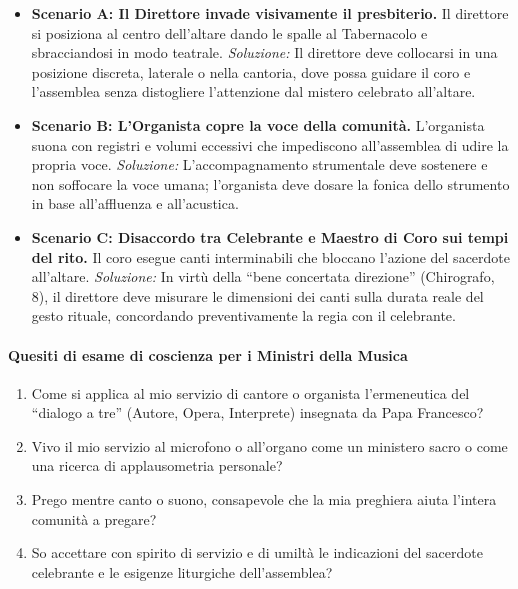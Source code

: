 \documentclass[12pt,a4paper]{article}
\begin{document}
	\begin{itemize}[leftmargin=*]
		\item \textbf{Scenario A: Il Direttore invade visivamente il presbiterio.} Il direttore si posiziona al centro dell'altare dando le spalle al Tabernacolo e sbracciandosi in modo teatrale. \emph{Soluzione:} Il direttore deve collocarsi in una posizione discreta, laterale o nella cantoria, dove possa guidare il coro e l'assemblea senza distogliere l'attenzione dal mistero celebrato all'altare.
		\item \textbf{Scenario B: L'Organista copre la voce della comunità.} L'organista suona con registri e volumi eccessivi che impediscono all'assemblea di udire la propria voce. \emph{Soluzione:} L'accompagnamento strumentale deve sostenere e non soffocare la voce umana; l'organista deve dosare la fonica dello strumento in base all'affluenza e all'acustica.
		\item \textbf{Scenario C: Disaccordo tra Celebrante e Maestro di Coro sui tempi del rito.} Il coro esegue canti interminabili che bloccano l'azione del sacerdote all'altare. \emph{Soluzione:} In virtù della ``bene concertata direzione'' (Chirografo, 8), il direttore deve misurare le dimensioni dei canti sulla durata reale del gesto rituale, concordando preventivamente la regia con il celebrante.
	\end{itemize}
	
	\paragraph{Quesiti di esame di coscienza per i Ministri della Musica}\label{quesiti-di-esame-di-coscienza-per-i-ministri-della-musica}
	
	\begin{enumerate}[label=\arabic*.,leftmargin=*]
		\item Come si applica al mio servizio di cantore o organista l'ermeneutica del ``dialogo a tre'' (Autore, Opera, Interprete) insegnata da Papa Francesco?
		\item Vivo il mio servizio al microfono o all'organo come un ministero sacro o come una ricerca di applausometria personale?
		\item Prego mentre canto o suono, consapevole che la mia preghiera aiuta l'intera comunità a pregare?
		\item So accettare con spirito di servizio e di umiltà le indicazioni del sacerdote celebrante e le esigenze liturgiche dell'assemblea?
	\end{enumerate}
	
\end{document}
